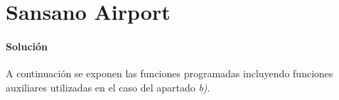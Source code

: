 \section{Sansano Airport}

  \paragraph{Solución}
  A continuación se exponen las funciones programadas
  incluyendo funciones auxiliares utilizadas en el caso
  del apartado \emph{b)}.
  
  
